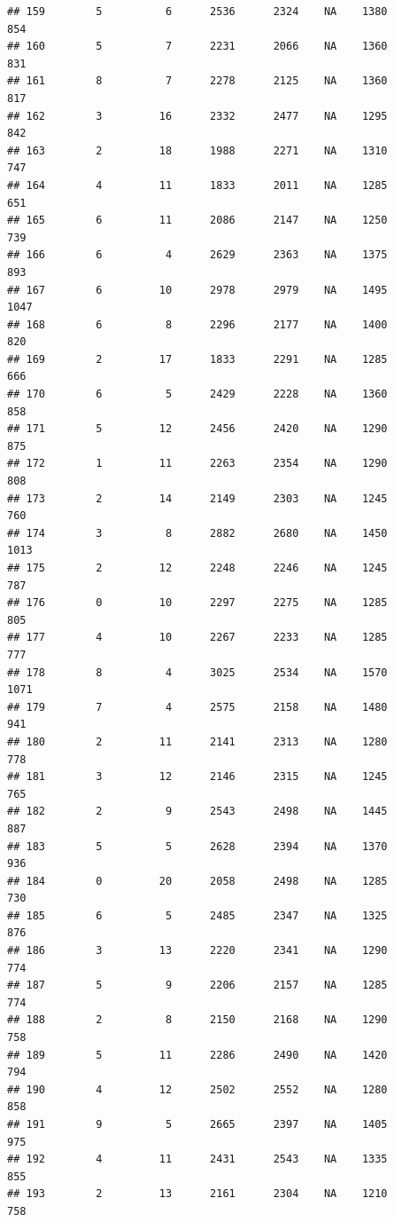 \documentclass[]{book}
\begin{document}
\begin{verbatim}
## 159        5          6      2536      2324    NA    1380            854
## 160        5          7      2231      2066    NA    1360            831
## 161        8          7      2278      2125    NA    1360            817
## 162        3         16      2332      2477    NA    1295            842
## 163        2         18      1988      2271    NA    1310            747
## 164        4         11      1833      2011    NA    1285            651
## 165        6         11      2086      2147    NA    1250            739
## 166        6          4      2629      2363    NA    1375            893
## 167        6         10      2978      2979    NA    1495           1047
## 168        6          8      2296      2177    NA    1400            820
## 169        2         17      1833      2291    NA    1285            666
## 170        6          5      2429      2228    NA    1360            858
## 171        5         12      2456      2420    NA    1290            875
## 172        1         11      2263      2354    NA    1290            808
## 173        2         14      2149      2303    NA    1245            760
## 174        3          8      2882      2680    NA    1450           1013
## 175        2         12      2248      2246    NA    1245            787
## 176        0         10      2297      2275    NA    1285            805
## 177        4         10      2267      2233    NA    1285            777
## 178        8          4      3025      2534    NA    1570           1071
## 179        7          4      2575      2158    NA    1480            941
## 180        2         11      2141      2313    NA    1280            778
## 181        3         12      2146      2315    NA    1245            765
## 182        2          9      2543      2498    NA    1445            887
## 183        5          5      2628      2394    NA    1370            936
## 184        0         20      2058      2498    NA    1285            730
## 185        6          5      2485      2347    NA    1325            876
## 186        3         13      2220      2341    NA    1290            774
## 187        5          9      2206      2157    NA    1285            774
## 188        2          8      2150      2168    NA    1290            758
## 189        5         11      2286      2490    NA    1420            794
## 190        4         12      2502      2552    NA    1280            858
## 191        9          5      2665      2397    NA    1405            975
## 192        4         11      2431      2543    NA    1335            855
## 193        2         13      2161      2304    NA    1210            758

\end{verbatim}
\end{document}
